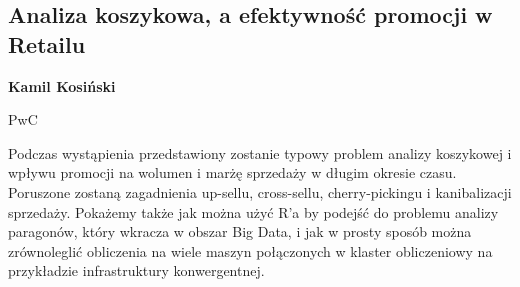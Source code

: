 \documentclass[\main/boa.tex]{subfiles}
\begin{document}
\subsection{Analiza koszykowa, a efektywność promocji w Retailu}

\begin{minipage}{0.915\textwidth}
	\centering
  {\bf {} Kamil Kosiński}
\end{minipage}


\begin{affiliations}
\begin{minipage}{0.915\textwidth}
\centering
PwC \\[-2pt]
\end{minipage}
\end{affiliations}

\vskip 0.3cm

 Podczas wystąpienia przedstawiony zostanie typowy problem analizy koszykowej i wpływu promocji na wolumen i marżę sprzedaży w długim okresie czasu. Poruszone zostaną zagadnienia up-sellu, cross-sellu, cherry-pickingu i kanibalizacji sprzedaży. Pokażemy także jak można użyć R'a by podejść do problemu analizy paragonów, który wkracza w obszar Big Data, i jak w prosty sposób można zrównoleglić obliczenia na wiele maszyn połączonych w klaster obliczeniowy na przykładzie infrastruktury konwergentnej. 
\end{document}
